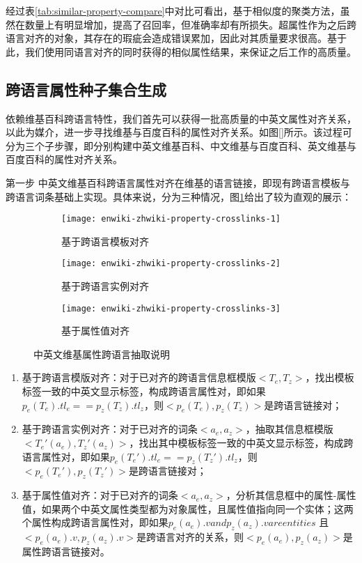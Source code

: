 经过表\ref{tab:similar-property-compare}中对比可看出，基于相似度的聚类方法，虽然在数量上有明显增加，提高了召回率，但准确率却有所损失。超属性作为之后跨语言对齐的对象，其存在的瑕疵会造成错误累加，因此对其质量要求很高。基于此，我们使用同语言对齐的同时获得的相似属性结果，来保证之后工作的高质量。

\subsection{跨语言属性种子集合生成}
\label{sec:cross-lingual-seed}
依赖维基百科跨语言特性，我们首先可以获得一批高质量的中英文属性对齐关系，以此为媒介，进一步寻找维基与百度百科的属性对齐关系。如图\ref{}所示。该过程可分为三个子步骤，即分别构建中英文维基百科、中文维基与百度百科、英文维基与百度百科的属性对齐关系。

{\heiti 第一步 中英文维基百科跨语言属性对齐}在维基的语言链接，即现有跨语言模板与跨语言词条基础上实现。具体来说，分为三种情况，图\ref{fig:cross-lingual-seed}给出了较为直观的展示：

\begin{figure}[h]
  \centering%
  \begin{subfigure}{3cm}
    \texttt{[image: enwiki-zhwiki-property-crosslinks-1]}
    \caption{基于跨语言模板对齐}
  \end{subfigure}%
  \hspace{4em}%
  \begin{subfigure}{0.5\textwidth}
    \texttt{[image: enwiki-zhwiki-property-crosslinks-2]}
    \caption{基于跨语言实例对齐}
  \end{subfigure}
  \begin{subfigure}{0.5\textwidth}
    \texttt{[image: enwiki-zhwiki-property-crosslinks-3]}
    \caption{基于属性值对齐}
  \end{subfigure}
  \caption{中英文维基属性跨语言抽取说明}
  \label{fig:cross-lingual-seed}
\end{figure}

\begin{enumerate}[1)]
\item  {\heiti 基于跨语言模版对齐：}对于已对齐的跨语言信息框模版$<T_e, T_z>$，找出模板标签一致的中英文显示标签，构成跨语言属性对，即如果$p_e(T_e).tl_e == p_z(T_z).tl_z$，则$<p_e(T_e), p_z(T_z)>$是跨语言链接对；
\item  {\heiti 基于跨语言实例对齐：}对于已对齐的词条$<a_e, a_z>$，抽取其信息框模版$<T_e'(a_e), T_z'(a_z)>$，找出其中模板标签一致的中英文显示标签，构成跨语言属性对，即如果$p_e(T_e').tl_e == p_z(T_z').tl_z$，则$<p_e(T_e'), p_z(T_z')>$是跨语言链接对；
\item  {\heiti 基于属性值对齐：}对于已对齐的词条$<a_e, a_z>$，分析其信息框中的属性-属性值，如果两个中英文属性类型都为对象属性，且属性值指向同一个实体；这两个属性构成跨语言属性对，即如果$p_e(a_e).v and p_z(a_z).v are entities$ 且 $<p_e(a_e).v, p_z(a_z).v>$是跨语言对齐的关系，则$<p_e(a_e), p_z(a_z)>$是属性跨语言链接对。
\end{enumerate}

